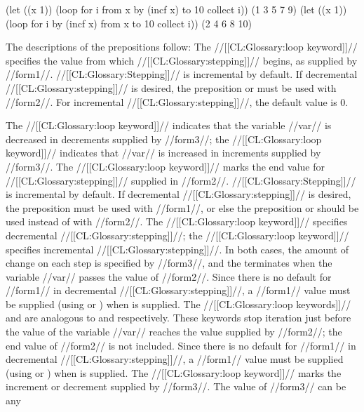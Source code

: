 \code (let ((x 1)) (loop for i from x by (incf x) to 10 collect i)) \EV (1 3 5 7 9) (let ((x 1)) (loop for i by (incf x) from x to 10 collect i)) \EV (2 4 6 8 10) \endcode

  The descriptions of the prepositions follow:
  \beginlist {}
  The //[[CL:Glossary:loop keyword]]//  specifies the value from which //[[CL:Glossary:stepping]]// begins, as supplied by //form1//.   //[[CL:Glossary:Stepping]]// is incremental by default.  If  decremental //[[CL:Glossary:stepping]]// is desired,  the preposition   or  must be used with //form2//.  For incremental //[[CL:Glossary:stepping]]//, the default  value is 0.

  The //[[CL:Glossary:loop keyword]]//   indicates that the variable //var// is decreased in decrements supplied by //form3//; the //[[CL:Glossary:loop keyword]]//  indicates that  //var// is increased in increments supplied by //form3//.
                                                   The //[[CL:Glossary:loop keyword]]//  marks the end value for //[[CL:Glossary:stepping]]// supplied in //form2//. //[[CL:Glossary:Stepping]]// is incremental by default. If decremental //[[CL:Glossary:stepping]]// is desired,  the preposition  must be used with //form1//, or else the preposition  or  should be used instead
   of  with //form2//.
  The //[[CL:Glossary:loop keyword]]//  specifies decremental //[[CL:Glossary:stepping]]//; the //[[CL:Glossary:loop keyword]]//  specifies incremental //[[CL:Glossary:stepping]]//. In both cases, the amount of change on each step is specified by //form3//, and the  terminates when the variable //var// passes  the value of //form2//. Since there is no default for //form1// in decremental //[[CL:Glossary:stepping]]//, a //form1// value must be supplied (using  or ) when  is supplied.
  The //[[CL:Glossary:loop keywords]]//  and  are analogous to  and  respectively.  These keywords stop iteration just before the value of the variable //var// reaches the value  supplied by //form2//; the end value of //form2// is not included. Since there is no default for //form1// in decremental //[[CL:Glossary:stepping]]//, a //form1// value must be supplied (using  or ) when  is supplied.
  The //[[CL:Glossary:loop keyword]]//  marks the increment or decrement supplied by //form3//.  The value of //form3// can be any 

